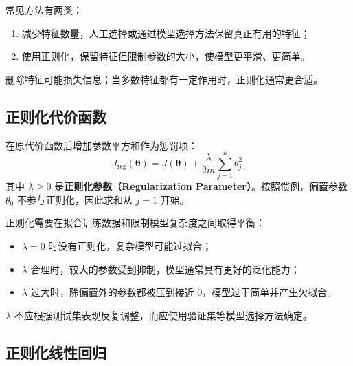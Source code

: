 \documentclass[12pt,a4paper]{ctexart}
\newcommand{\concept}[1]{\textbf{\textcolor{DefineColor}{#1}}}
\begin{document}
\begin{keybox}[处理过拟合的基本思路]
常见方法有两类：
\begin{enumerate}
  \item 减少特征数量，人工选择或通过模型选择方法保留真正有用的特征；
  \item 使用正则化，保留特征但限制参数的大小，使模型更平滑、更简单。
\end{enumerate}
删除特征可能损失信息；当多数特征都有一定作用时，正则化通常更合适。
\end{keybox}

\subsection{正则化代价函数}

\begin{definitionbox}[$L_2$ 正则化]
在原代价函数后增加参数平方和作为惩罚项：
\[
  J_{\mathrm{reg}}(\boldsymbol{\theta})
  =J(\boldsymbol{\theta})
  +\frac{\lambda}{2m}\sum_{j=1}^{n}\theta_j^2.
\]
其中 $\lambda\geq0$ 是\concept{正则化参数（Regularization Parameter）}。按照惯例，偏置参数 $\theta_0$ 不参与正则化，因此求和从 $j=1$ 开始。
\end{definitionbox}

\begin{keybox}
正则化需要在拟合训练数据和限制模型复杂度之间取得平衡：
\begin{itemize}
  \item $\lambda=0$ 时没有正则化，复杂模型可能过拟合；
  \item $\lambda$ 合理时，较大的参数受到抑制，模型通常具有更好的泛化能力；
  \item $\lambda$ 过大时，除偏置外的参数都被压到接近 $0$，模型过于简单并产生欠拟合。
\end{itemize}
$\lambda$ 不应根据测试集表现反复调整，而应使用验证集等模型选择方法确定。
\end{keybox}

\subsection{正则化线性回归}
\end{document}

